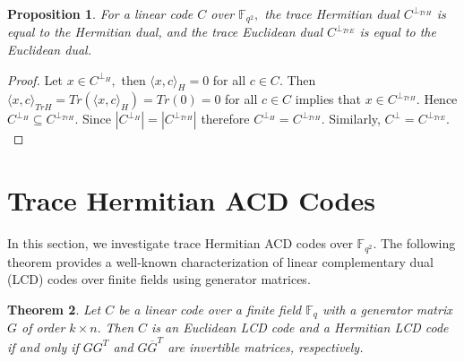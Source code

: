 \documentclass[sn-mathphys-num]{sn-jnl}%
\theoremstyle{thmstyleone}%
\newtheorem{theorem}{Theorem}%
\newtheorem{proposition}[theorem]{Proposition}%
\theoremstyle{thmstyletwo}%
\theoremstyle{thmstylethree}%
\begin{document}
\begin{proposition}\label{hlcdtohacd}
	For a linear code $C$ over $\mathbb{F}_{q^2},$ the trace Hermitian dual $C^{\perp_{TrH}}$ is equal to the  Hermitian dual, and the trace Euclidean dual $C^{\perp_{TrE}}$ is equal to the Euclidean dual.
\end{proposition}
\begin{proof}
	Let $x\in C^{\perp_H},$ then $\langle x,c\rangle_H=0$  for all $c\in C.$ Then $\langle x ,c\rangle_{TrH}=Tr(\langle x,c\rangle_H)=Tr(0)=0$ for all $c\in C$ implies that $x\in C^{\perp_{TrH}}. $ Hence $C^{\perp_H}\subseteq C^{\perp_{TrH}}.$ Since $|C^{\perp_H}|=|C^{\perp_{TrH}}|$ therefore $C^{\perp_H}=C^{\perp_{TrH}}.$ Similarly, $C^{\perp}=C^{\perp_{TrE}}.$
\end{proof}

\section{Trace Hermitian ACD Codes}\label{trhacd}
In this section, we investigate trace Hermitian ACD codes over $\mathbb{F}_{q^2}.$ The following theorem provides a well-known characterization of linear complementary dual (LCD) codes over finite fields using generator matrices.

\begin{theorem}\cite[Proposition 1]{masseylcd}\cite[Proposition 1]{lcdhg}\label{lcdgenerator}
	Let $C$ be a linear code over a finite field $\mathbb{F}_q$ with a generator matrix $G$ of order $k\times n.$ Then $C$ is an Euclidean LCD code and a Hermitian LCD code if and only if $GG^T$ and $G\overline{G}^T$ are invertible matrices, respectively.
\end{theorem}
\end{document}
